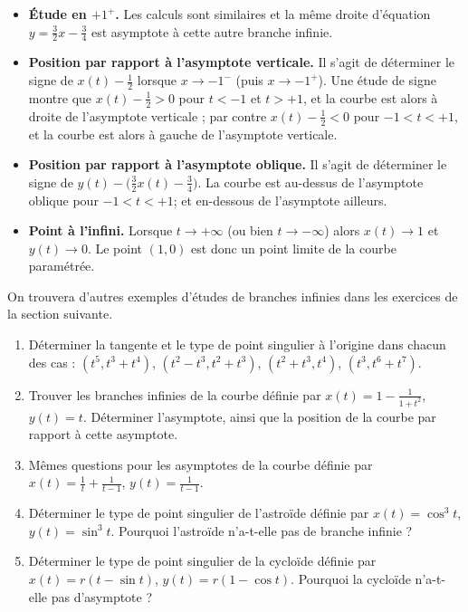 \documentclass[class=report,crop=false]{standalone}
\begin{document}
\begin{exemple}
\begin{itemize}
  \item \textbf{Étude en $+1^+$.}  Les calculs sont similaires
  et la même droite d'équation $y = \frac32 x -\frac34$ est asymptote
  à cette autre branche infinie.

  \item \textbf{Position par rapport à l'asymptote verticale.}
  Il s'agit de déterminer le signe de $x(t) - \frac12$ lorsque
  $x \to -1^-$ (puis $x \to -1^+$).
  Une étude de signe montre que $x(t)-\frac12 > 0$ pour $t < -1$ et $t>+1$,
  et la courbe est alors à droite de l'asymptote verticale ; par contre
  $x(t)-\frac12 < 0$ pour $-1 < t < +1$, et la courbe est alors à gauche
  de l'asymptote verticale.

  \item \textbf{Position par rapport à l'asymptote oblique.}
  Il s'agit de déterminer le signe de $y(t) - \big( \frac32 x(t) -\frac34 \big)$.
  La courbe est au-dessus de l'asymptote oblique pour $-1 < t < +1$;
  et en-dessous de l'asymptote ailleurs.

  \item \textbf{Point à l'infini.} Lorsque $t\to +\infty$ (ou bien $t\to-\infty$) alors
  $x(t) \to 1$ et $y(t) \to 0$. Le point $(1,0)$ est donc un point limite de la courbe
  paramétrée.

\end{itemize}



\end{exemple}

On trouvera d'autres exemples d'études de branches infinies dans
les exercices de la section suivante.




\begin{miniexercices}
\sauteligne
\begin{enumerate}
  \item Déterminer la tangente et le type de point singulier à l'origine
  dans chacun des cas :
  $(t^5,t^3+t^4)$, $(t^2-t^3,t^2+t^3)$, $(t^2+t^3,t^4)$, $(t^3,t^6+t^7)$.

  \item Trouver les branches infinies de la courbe définie par
  $x(t) = 1-\frac{1}{1+t^2}$, $y(t)=t$. Déterminer l'asymptote, ainsi que la position
  de la courbe par rapport à cette asymptote.

  \item Mêmes questions pour les asymptotes de la courbe définie par
  $x(t) = \frac{1}{t}+\frac{1}{t-1}$, $y(t)=\frac{1}{t-1}$.

  \item Déterminer le type de point singulier de l'astroïde définie par $x(t) = \cos^3 t$,
  $y(t) = \sin^3 t$. Pourquoi l'astroïde n'a-t-elle pas de branche infinie ?

  \item Déterminer le type de point singulier de la cycloïde définie par
  $x(t) = r(t-\sin t)$,  $y(t) = r(1-\cos t)$. Pourquoi la cycloïde
  n'a-t-elle pas d'asymptote ?
\end{enumerate}
\end{miniexercices}
\end{document}
